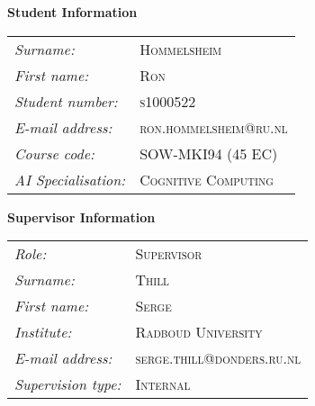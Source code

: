 






    
    \vspace{3cm}
    \textbf{Student Information} \\

    \begin{tabular}{L{3cm}l}
                \emph{Surname:} & \textsc{Hommelsheim} \\
                \emph{First name:} & \textsc{Ron} \\
                \emph{Student number:} & \textsc{s1000522} \\
                \emph{E-mail address:} & \textsc{ron.hommelsheim@ru.nl} \\
                \emph{Course code:} & \textsc{SOW-MKI94 (45 EC)} \\
                \emph{AI Specialisation:} & \textsc{Cognitive Computing} \\
        \end{tabular}
	
  \vspace{1cm}
  \textbf{Supervisor Information} \\

    \begin{tabular}{L{3cm}l}
            \emph{Role:} & \textsc{Supervisor} \\
            \emph{Surname:} & \textsc{Thill} \\
            \emph{First name:} & \textsc{Serge} \\
            \emph{Institute:} & \textsc{Radboud University} \\
            \emph{E-mail address:} & \textsc{serge.thill@donders.ru.nl} \\
            \emph{Supervision type:} & \textsc{Internal} \\
    \end{tabular}



\clearpage